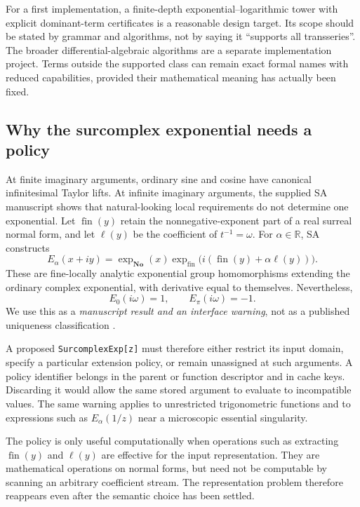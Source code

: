 \documentclass[11pt,letterpaper]{article}
\theoremstyle{definition}\newtheorem{definition}[theorem]{Definition}
\theoremstyle{remark}\newtheorem{remark}[theorem]{Remark}
\newcommand{\No}{\mathbf{No}}\newcommand{\SC}{\mathbf{SC}}
\newcommand{\R}{\mathbb R}\newcommand{\C}{\mathbb C}
\newcommand{\code}[1]{\texttt{#1}}
\numberwithin{equation}{section}\setcounter{tocdepth}{2}
\begin{document}
For a first implementation, a finite-depth exponential--logarithmic tower with explicit dominant-term certificates is a reasonable design target. Its scope should be stated by grammar and algorithms, not by saying it ``supports all transseries''. The broader differential-algebraic algorithms are a separate implementation project. Terms outside the supported class can remain exact formal names with reduced capabilities, provided their mathematical meaning has actually been fixed.

\subsection{Why the surcomplex exponential needs a policy}
At finite imaginary arguments, ordinary sine and cosine have canonical infinitesimal Taylor lifts. At infinite imaginary arguments, the supplied SA manuscript shows that natural-looking local requirements do not determine one exponential. Let $\operatorname{fin}(y)$ retain the nonnegative-exponent part of a real surreal normal form, and let $\ell(y)$ be the coefficient of $t^{-1}=\omega$. For $\alpha\in\R$, SA constructs
\begin{equation}\label{eq:phaseexp}
 E_\alpha(x+iy)=\exp_{\No}(x)
 \exp_{\mathrm{fin}}\bigl(i(\operatorname{fin}(y)+\alpha\ell(y))\bigr).
\end{equation}
These are fine-locally analytic exponential group homomorphisms extending the ordinary complex exponential, with derivative equal to themselves. Nevertheless,
\begin{equation}\label{eq:phasecontrast}
 E_0(i\omega)=1,\qquad E_\pi(i\omega)=-1.
\end{equation}
We use this as a \emph{manuscript result and an interface warning}, not as a published uniqueness classification \cite[Section 11]{SA}.

A proposed \code{SurcomplexExp[z]} must therefore either restrict its input domain, specify a particular extension policy, or remain unassigned at such arguments. A policy identifier belongs in the parent or function descriptor and in cache keys. Discarding it would allow the same stored argument to evaluate to incompatible values. The same warning applies to unrestricted trigonometric functions and to expressions such as $E_\alpha(1/z)$ near a microscopic essential singularity.

The policy is only useful computationally when operations such as extracting $\operatorname{fin}(y)$ and $\ell(y)$ are effective for the input representation. They are mathematical operations on normal forms, but need not be computable by scanning an arbitrary coefficient stream. The representation problem therefore reappears even after the semantic choice has been settled.
\end{document}
